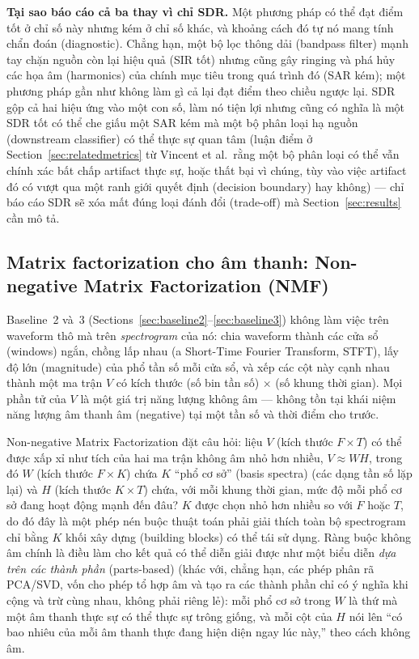 \documentclass[11pt]{article}
\begin{document}
\textbf{Tại sao báo cáo cả ba thay vì chỉ SDR.} Một phương pháp có thể đạt
điểm tốt ở chỉ số này nhưng kém ở chỉ số khác, và khoảng cách đó tự nó
mang tính chẩn đoán (diagnostic). Chẳng hạn, một bộ lọc thông dải
(bandpass filter) mạnh tay chặn nguồn còn lại hiệu quả (SIR tốt) nhưng
cũng gây ringing và phá hủy các họa âm (harmonics) của chính mục tiêu
trong quá trình đó (SAR kém); một phương pháp gần như không làm gì cả lại
đạt điểm theo chiều ngược lại. SDR gộp cả hai hiệu ứng vào một con số, làm
nó tiện lợi nhưng cũng có nghĩa là một SDR tốt có thể che giấu một SAR
kém mà một bộ phân loại hạ nguồn (downstream classifier) có thể thực sự
quan tâm (luận điểm ở Section~\ref{sec:relatedmetrics} từ Vincent et al.\
rằng một bộ phân loại có thể vẫn chính xác bất chấp artifact thực sự, hoặc
thất bại vì chúng, tùy vào việc artifact đó có vượt qua một ranh giới
quyết định (decision boundary) hay không) --- chỉ báo cáo SDR sẽ xóa mất
đúng loại đánh đổi (trade-off) mà Section~\ref{sec:results} cần mô tả.

\subsection{Matrix factorization cho âm thanh: Non-negative Matrix Factorization (NMF)}
\label{sec:bg-nmf}

Baseline~2 và~3 (Sections~\ref{sec:baseline2}--\ref{sec:baseline3}) không
làm việc trên waveform thô mà trên \emph{spectrogram} của nó: chia
waveform thành các cửa sổ (windows) ngắn, chồng lấp nhau (a Short-Time
Fourier Transform, STFT), lấy độ lớn (magnitude) của phổ tần số mỗi cửa
sổ, và xếp các cột này cạnh nhau thành một ma trận $V$ có kích thước (số
bin tần số) $\times$ (số khung thời gian). Mọi phần tử của $V$ là một giá
trị năng lượng không âm --- không tồn tại khái niệm năng lượng âm thanh âm
(negative) tại một tần số và thời điểm cho trước.

Non-negative Matrix Factorization đặt câu hỏi: liệu $V$ (kích thước
$F\times T$) có thể được xấp xỉ như tích của hai ma trận không âm nhỏ hơn
nhiều, $V \approx WH$, trong đó $W$ (kích thước $F\times K$) chứa $K$
``phổ cơ sở'' (basis spectra) (các dạng tần số lặp lại) và $H$ (kích
thước $K\times T$) chứa, với mỗi khung thời gian, mức độ mỗi phổ cơ sở
đang hoạt động mạnh đến đâu? $K$ được chọn nhỏ hơn nhiều so với $F$ hoặc
$T$, do đó đây là một phép nén buộc thuật toán phải giải thích toàn bộ
spectrogram chỉ bằng $K$ khối xây dựng (building blocks) có thể tái sử
dụng. Ràng buộc không âm chính là điều làm cho kết quả có thể diễn giải
được như một biểu diễn \emph{dựa trên các thành phần} (parts-based)
(khác với, chẳng hạn, các phép phân rã PCA/SVD, vốn cho phép tổ hợp âm và
tạo ra các thành phần chỉ có ý nghĩa khi cộng và trừ cùng nhau, không phải
riêng lẻ): mỗi phổ cơ sở trong $W$ là thứ mà một âm thanh thực sự có thể
thực sự trông giống, và mỗi cột của $H$ nói lên ``có bao nhiêu của mỗi âm
thanh thực đang hiện diện ngay lúc này,'' theo cách không âm.
\end{document}
